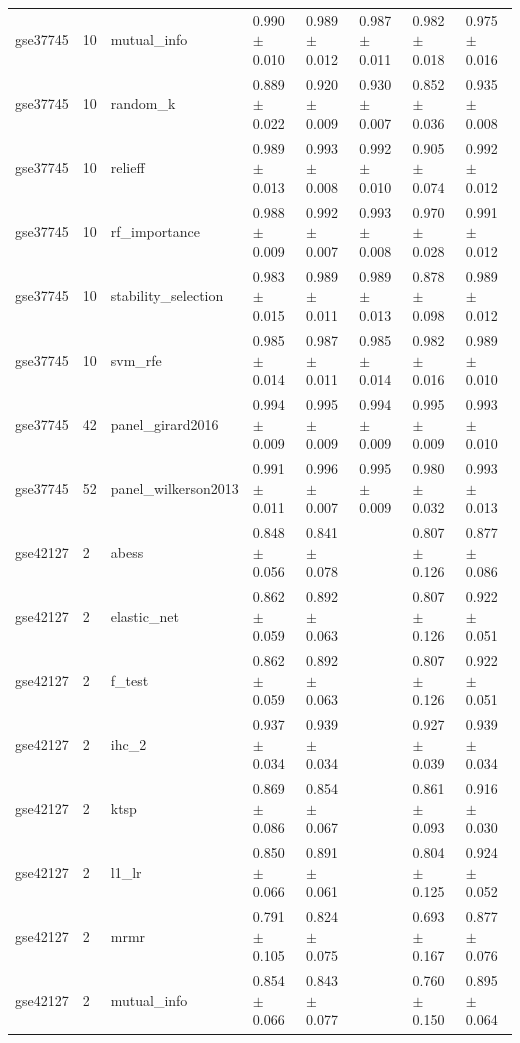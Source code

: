 \begin{table}[t]
\begin{tabular}{llllllll}
    gse37745 & 10 & mutual\_info & 0.990 $\pm$ 0.010 & 0.989 $\pm$ 0.012 & 0.987 $\pm$ 0.011 & 0.982 $\pm$ 0.018 & 0.975 $\pm$ 0.016 \\
    gse37745 & 10 & random\_k & 0.889 $\pm$ 0.022 & 0.920 $\pm$ 0.009 & 0.930 $\pm$ 0.007 & 0.852 $\pm$ 0.036 & 0.935 $\pm$ 0.008 \\
    gse37745 & 10 & relieff & 0.989 $\pm$ 0.013 & 0.993 $\pm$ 0.008 & 0.992 $\pm$ 0.010 & 0.905 $\pm$ 0.074 & 0.992 $\pm$ 0.012 \\
    gse37745 & 10 & rf\_importance & 0.988 $\pm$ 0.009 & 0.992 $\pm$ 0.007 & 0.993 $\pm$ 0.008 & 0.970 $\pm$ 0.028 & 0.991 $\pm$ 0.012 \\
    gse37745 & 10 & stability\_selection & 0.983 $\pm$ 0.015 & 0.989 $\pm$ 0.011 & 0.989 $\pm$ 0.013 & 0.878 $\pm$ 0.098 & 0.989 $\pm$ 0.012 \\
    gse37745 & 10 & svm\_rfe & 0.985 $\pm$ 0.014 & 0.987 $\pm$ 0.011 & 0.985 $\pm$ 0.014 & 0.982 $\pm$ 0.016 & 0.989 $\pm$ 0.010 \\
    gse37745 & 42 & panel\_girard2016 & 0.994 $\pm$ 0.009 & 0.995 $\pm$ 0.009 & 0.994 $\pm$ 0.009 & 0.995 $\pm$ 0.009 & 0.993 $\pm$ 0.010 \\
    gse37745 & 52 & panel\_wilkerson2013 & 0.991 $\pm$ 0.011 & 0.996 $\pm$ 0.007 & 0.995 $\pm$ 0.009 & 0.980 $\pm$ 0.032 & 0.993 $\pm$ 0.013 \\
    gse42127 & 2 & abess & 0.848 $\pm$ 0.056 & 0.841 $\pm$ 0.078 &  & 0.807 $\pm$ 0.126 & 0.877 $\pm$ 0.086 \\
    gse42127 & 2 & elastic\_net & 0.862 $\pm$ 0.059 & 0.892 $\pm$ 0.063 &  & 0.807 $\pm$ 0.126 & 0.922 $\pm$ 0.051 \\
    gse42127 & 2 & f\_test & 0.862 $\pm$ 0.059 & 0.892 $\pm$ 0.063 &  & 0.807 $\pm$ 0.126 & 0.922 $\pm$ 0.051 \\
    gse42127 & 2 & ihc\_2 & 0.937 $\pm$ 0.034 & 0.939 $\pm$ 0.034 &  & 0.927 $\pm$ 0.039 & 0.939 $\pm$ 0.034 \\
    gse42127 & 2 & ktsp & 0.869 $\pm$ 0.086 & 0.854 $\pm$ 0.067 &  & 0.861 $\pm$ 0.093 & 0.916 $\pm$ 0.030 \\
    gse42127 & 2 & l1\_lr & 0.850 $\pm$ 0.066 & 0.891 $\pm$ 0.061 &  & 0.804 $\pm$ 0.125 & 0.924 $\pm$ 0.052 \\
    gse42127 & 2 & mrmr & 0.791 $\pm$ 0.105 & 0.824 $\pm$ 0.075 &  & 0.693 $\pm$ 0.167 & 0.877 $\pm$ 0.076 \\
    gse42127 & 2 & mutual\_info & 0.854 $\pm$ 0.066 & 0.843 $\pm$ 0.077 &  & 0.760 $\pm$ 0.150 & 0.895 $\pm$ 0.064 \\

\end{tabular}
\end{table}
